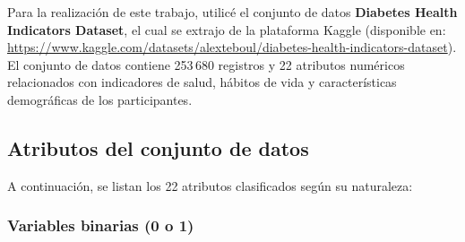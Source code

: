\documentclass[a4paper,10pt]{book}
\begin{document}
Para la realización de este trabajo, utilicé el conjunto de datos \textbf{Diabetes Health Indicators Dataset}, el cual se extrajo de la plataforma Kaggle (disponible en: \url{https://www.kaggle.com/datasets/alexteboul/diabetes-health-indicators-dataset}). El conjunto de datos contiene 253\,680 registros y 22 atributos numéricos relacionados con indicadores de salud, hábitos de vida y características demográficas de los participantes.

\subsection*{Atributos del conjunto de datos}

A continuación, se listan los 22 atributos clasificados según su naturaleza:

\subsubsection*{Variables binarias (0 o 1)}
\end{document}
